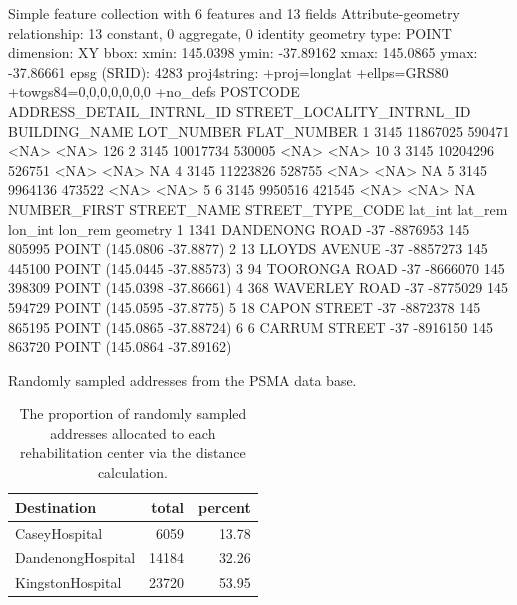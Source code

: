 \documentclass[utf8]{frontiersHLTH}
\begin{document}
\begin{table}[h]
\begin{verbnobox}[\fontsize{6pt}{6pt}\selectfont]
Simple feature collection with 6 features and 13 fields
Attribute-geometry relationship: 13 constant, 0 aggregate, 0 identity
geometry type:  POINT
dimension:      XY
bbox:           xmin: 145.0398 ymin: -37.89162 xmax: 145.0865 ymax: -37.86661
epsg (SRID):    4283
proj4string:    +proj=longlat +ellps=GRS80 +towgs84=0,0,0,0,0,0,0 +no_defs
  POSTCODE ADDRESS_DETAIL_INTRNL_ID STREET_LOCALITY_INTRNL_ID BUILDING_NAME LOT_NUMBER FLAT_NUMBER
1     3145                 11867025                    590471          <NA>       <NA>         126
2     3145                 10017734                    530005          <NA>       <NA>          10
3     3145                 10204296                    526751          <NA>       <NA>          NA
4     3145                 11223826                    528755          <NA>       <NA>          NA
5     3145                  9964136                    473522          <NA>       <NA>           5
6     3145                  9950516                    421545          <NA>       <NA>          NA
  NUMBER_FIRST STREET_NAME STREET_TYPE_CODE lat_int  lat_rem lon_int lon_rem                   geometry
1         1341   DANDENONG             ROAD     -37 -8876953     145  805995  POINT (145.0806 -37.8877)
2           13      LLOYDS           AVENUE     -37 -8857273     145  445100 POINT (145.0445 -37.88573)
3           94    TOORONGA             ROAD     -37 -8666070     145  398309 POINT (145.0398 -37.86661)
4          368    WAVERLEY             ROAD     -37 -8775029     145  594729  POINT (145.0595 -37.8775)
5           18       CAPON           STREET     -37 -8872378     145  865195 POINT (145.0865 -37.88724)
6            6      CARRUM           STREET     -37 -8916150     145  863720 POINT (145.0864 -37.89162)
\end{verbnobox}
\caption{Randomly sampled addresses from the PSMA data base.\label{tab:headpsma}}
\end{table}

\begin{table}
\begin{tabular}{l|r|r}
\hline
Destination & total & percent\\
\hline
CaseyHospital & 6059 & 13.78\\
\hline
DandenongHospital & 14184 & 32.26\\
\hline
KingstonHospital & 23720 & 53.95\\
\hline
\end{tabular}

\caption{The proportion of randomly sampled addresses allocated to each rehabilitation center via the distance calculation.\label{tab:rehabrandomassignment}}
\end{table}
\end{document}
